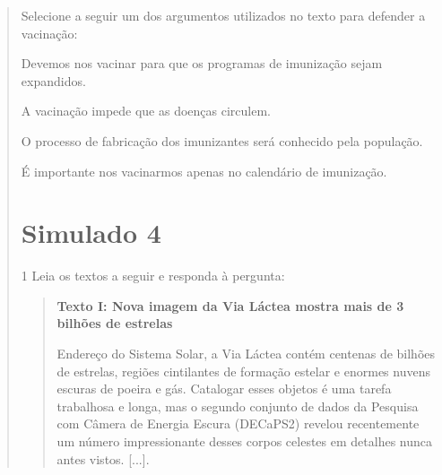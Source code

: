 \begin{quote}
\begin{quote}
\end{quote}

Selecione a seguir um dos argumentos utilizados no texto para defender a
vacinação:

\begin{escolha}
\item Devemos nos vacinar para que os programas de imunização sejam expandidos.

\item A vacinação impede que as doenças circulem.

\item O processo de fabricação dos imunizantes será conhecido pela população.

\item É importante nos vacinarmos apenas no calendário de imunização.
\end{escolha}


\chapter{Simulado 4}

\num{1} Leia os textos a seguir e responda à pergunta:

\begin{quote}
\textbf{Texto I: Nova imagem da Via Láctea mostra mais de 3 bilhões de
estrelas}

Endereço do Sistema Solar, a Via Láctea contém centenas de bilhões de
estrelas, regiões cintilantes de formação estelar e enormes nuvens
escuras de poeira e gás. Catalogar esses objetos é uma tarefa trabalhosa
e longa, mas o segundo conjunto de dados da Pesquisa com Câmera de
Energia Escura (DECaPS2) revelou recentemente um número impressionante
desses corpos celestes em detalhes nunca antes vistos. {[}...{]}.


\end{quote}
\end{quote}
